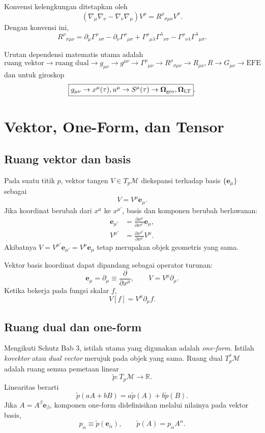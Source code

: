 \documentclass[12pt,a4paper]{report}
\newcommand{\pd}{\partial}
\newcommand{\e}{\mathbf{e}}
\newcommand{\oneformp}{\widetilde{p}}
\begin{document}
Konvensi kelengkungan ditetapkan oleh
\[
 (\nabla_\mu\nabla_\nu-\nabla_\nu\nabla_\mu)V^\rho
 =R^\rho{}_{\sigma\mu\nu}V^\sigma.
\]
Dengan konvensi ini,
\[
 R^\rho{}_{\sigma\mu\nu}
 =\pd_\mu\Gamma^\rho{}_{\nu\sigma}
 -\pd_\nu\Gamma^\rho{}_{\mu\sigma}
 +\Gamma^\rho{}_{\mu\lambda}\Gamma^\lambda{}_{\nu\sigma}
 -\Gamma^\rho{}_{\nu\lambda}\Gamma^\lambda{}_{\mu\sigma}.
\]

Urutan dependensi matematis utama adalah
\[
\boxed{
\text{ruang vektor}
\to\text{ruang dual}
\to g_{\mu\nu}
\to g^{\mu\nu}
\to\Gamma^\rho{}_{\mu\nu}
\to R^\rho{}_{\sigma\mu\nu}
\to R_{\mu\nu},R
\to G_{\mu\nu}
\to\text{EFE}}
\]
dan untuk giroskop
\[
\boxed{
g_{\mu\nu}
\to x^\mu(\tau),u^\mu
\to S^\mu(\tau)
\to\bm\Omega_{\rm geo},\bm\Omega_{\rm LT}}.
\]

\chapter{Vektor, One-Form, dan Tensor}

\section{Ruang vektor dan basis}

Pada suatu titik $p$, vektor tangen $V\in T_p\mathcal{M}$ diekspansi terhadap basis
$\{\e_\mu\}$ sebagai
\[
 V=V^\mu\e_\mu.
\]
Jika koordinat berubah dari $x^\mu$ ke $x^{\mu'}$, basis dan komponen berubah
berlawanan:
\begin{align}
 \e_{\mu'}&=\frac{\pd x^\mu}{\pd x^{\mu'}}\e_\mu,\\
 V^{\mu'}&=\frac{\pd x^{\mu'}}{\pd x^\mu}V^\mu.
\end{align}
Akibatnya $V=V^{\mu'}\e_{\mu'}=V^\mu\e_\mu$ tetap merupakan objek geometris
yang sama.

Vektor basis koordinat dapat dipandang sebagai operator turunan:
\[
 \e_\mu=\pd_\mu\equiv\frac{\pd}{\pd x^\mu},
 \qquad V=V^\mu\pd_\mu.
\]
Ketika bekerja pada fungsi skalar $f$,
\[
 V[f]=V^\mu\pd_\mu f.
\]

\section{Ruang dual dan one-form}

Mengikuti Schutz Bab 3, istilah utama yang digunakan adalah \emph{one-form}.
Istilah \emph{kovektor} atau \emph{dual vector} merujuk pada objek yang sama.
Ruang dual $T_p^*\mathcal{M}$ adalah ruang semua pemetaan linear
\[
 \oneformp:T_p\mathcal{M}\longrightarrow\mathbb{R}.
\]
Linearitas berarti
\[
 \oneformp(aA+bB)=a\oneformp(A)+b\oneformp(B).
\]
Jika $A=A^\beta\e_\beta$, komponen one-form didefinisikan melalui nilainya pada
vektor basis,
\[
 p_\alpha\equiv\oneformp(\e_\alpha),
 \qquad
 \oneformp(A)=p_\alpha A^\alpha.
\]
\end{document}

